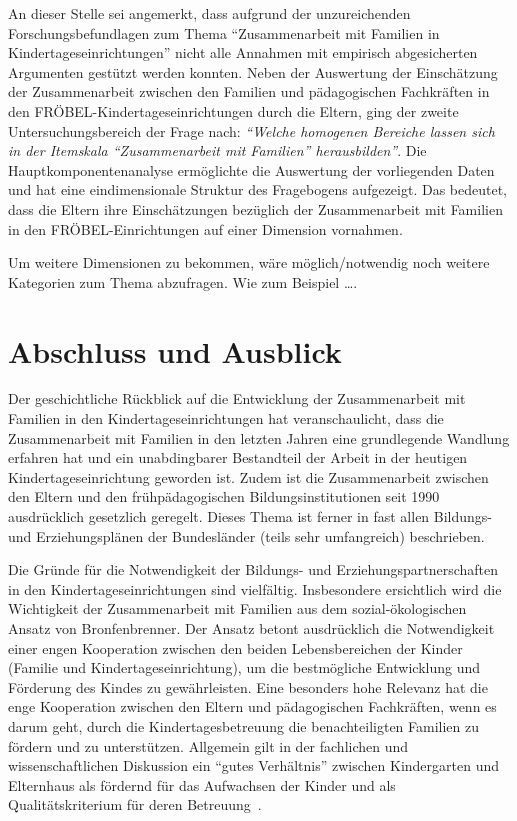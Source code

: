 \documentclass[12pt,a4paper]{article}
\begin{document}
	An dieser Stelle sei angemerkt, dass aufgrund der unzureichenden Forschungsbefundlagen zum Thema "`Zusammenarbeit mit Familien in Kindertageseinrichtungen"' nicht alle Annahmen mit empirisch abgesicherten Argumenten gestützt werden konnten.
Neben der Auswertung der Einschätzung der Zusammenarbeit zwischen den Familien und pädagogischen Fachkräften in den FRÖBEL-Kindertageseinrichtungen durch die Eltern, ging der zweite Untersuchungsbereich der Frage nach: \textit{"`Welche homogenen Bereiche lassen sich in der Itemskala "`Zusammenarbeit mit Familien"' herausbilden"'}. Die Hauptkomponentenanalyse ermöglichte die Auswertung der vorliegenden Daten und hat eine eindimensionale Struktur des Fragebogens aufgezeigt. Das bedeutet, dass die Eltern ihre Einschätzungen bezüglich der Zusammenarbeit mit Familien in den FRÖBEL-Einrichtungen auf einer Dimension vornahmen. 

Um weitere Dimensionen zu bekommen, wäre möglich/notwendig noch weitere Kategorien zum Thema abzufragen. Wie zum Beispiel …. %
	
\section{Abschluss und Ausblick}
	
Der geschichtliche Rückblick auf die Entwicklung der Zusammenarbeit mit Familien in den Kindertageseinrichtungen hat veranschaulicht, dass die Zusammenarbeit mit Familien in den letzten Jahren eine grundlegende Wandlung erfahren hat und ein unabdingbarer Bestandteil der Arbeit in der heutigen Kindertageseinrichtung geworden ist. Zudem ist die Zusammenarbeit zwischen den Eltern und den frühpädagogischen Bildungsinstitutionen seit 1990 ausdrücklich gesetzlich geregelt. Dieses Thema ist ferner in fast allen Bildungs- und Erziehungsplänen der Bundesländer (teils sehr umfangreich) beschrieben. 

	Die Gründe für die Notwendigkeit der Bildungs- und Erziehungspartnerschaften in den Kindertageseinrichtungen sind vielfältig. Insbesondere ersichtlich wird die Wichtigkeit der Zusammenarbeit mit Familien aus dem sozial-ökologischen Ansatz von Bronfenbrenner. Der Ansatz betont ausdrücklich die Notwendigkeit einer engen Kooperation zwischen den beiden Lebensbereichen der Kinder (Familie und Kindertageseinrichtung), um die bestmögliche Entwicklung und Förderung des Kindes zu gewährleisten. Eine besonders hohe Relevanz hat die enge Kooperation zwischen den Eltern und pädagogischen Fachkräften, wenn es darum geht, durch die Kindertagesbetreuung die benachteiligten Familien zu fördern und zu unterstützen. Allgemein gilt in der fachlichen und wissenschaftlichen Diskussion ein "`gutes Verhältnis"' zwischen Kindergarten und Elternhaus als fördernd für das Aufwachsen der Kinder und als Qualitätskriterium für deren Betreuung~\parencite{Fthenakis_1998}.
	
\end{document}

